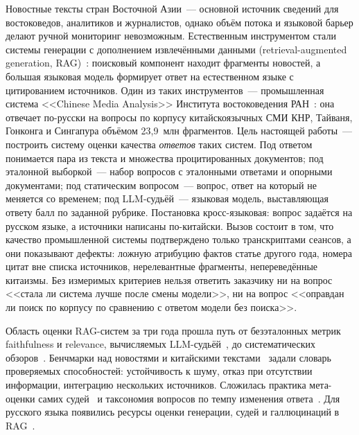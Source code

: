 \documentclass{article}
\begin{document}
Новостные тексты стран Восточной Азии~--- основной источник сведений для востоковедов, аналитиков и журналистов, однако объём потока и языковой барьер делают ручной мониторинг невозможным. Естественным инструментом стали системы генерации с дополнением извлечёнными данными (retrieval-augmented generation, RAG)~\cite{lewis2020rag}: поисковый компонент находит фрагменты новостей, а большая языковая модель формирует ответ на естественном языке с цитированием источников. Один из таких инструментов~--- промышленная система <<Chinese Media Analysis>> Института востоковедения РАН~\cite{bagrov2026digital}: она отвечает по-русски на вопросы по корпусу китайскоязычных СМИ КНР, Тайваня, Гонконга и Сингапура объёмом 23,9~млн фрагментов. Цель настоящей работы~--- построить систему оценки качества \emph{ответов} таких систем. Под ответом понимается пара из текста и множества процитированных документов; под эталонной выборкой~--- набор вопросов с эталонными ответами и опорными документами; под статическим вопросом~--- вопрос, ответ на который не меняется со временем; под LLM-судьёй~--- языковая модель, выставляющая ответу балл по заданной рубрике. Постановка кросс-языковая: вопрос задаётся на русском языке, а источники написаны по-китайски. Вызов состоит в том, что качество промышленной системы подтверждено только транскриптами сеансов, а они показывают дефекты: ложную атрибуцию фактов статье другого года, номера цитат вне списка источников, нерелевантные фрагменты, непереведённые китаизмы. Без измеримых критериев нельзя ответить заказчику ни на вопрос <<стала ли система лучше после смены модели>>, ни на вопрос <<оправдан ли поиск по корпусу по сравнению с ответом модели без поиска>>.

Область оценки RAG-систем за три года прошла путь от безэталонных метрик faithfulness и relevance, вычисляемых LLM-судьёй~\cite{es2023ragas}, до систематических обзоров~\cite{gan2025ragevaluation}. Бенчмарки над новостями и китайскими текстами~\cite{chen2023rgb,yang2024crag,chen2025chronoqa} задали словарь проверяемых способностей: устойчивость к шуму, отказ при отсутствии информации, интеграцию нескольких источников. Сложилась практика мета-оценки самих судей~\cite{zheng2023judging,norman2026reliability} и таксономия вопросов по темпу изменения ответа~\cite{vu2023freshllms,piryani2026recency}. Для русского языка появились ресурсы оценки генерации, судей и галлюцинаций в RAG~\cite{pugachev2025repa,martynov2025pollux,sadkovskii2026rushallu}.
\end{document}
